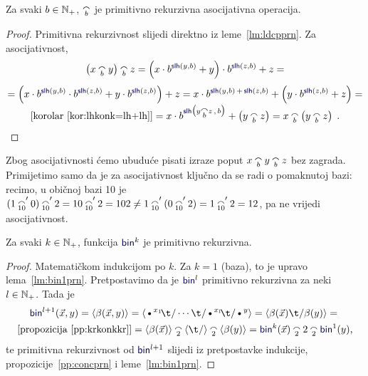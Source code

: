 \begin{propozicija}[{name=[primitivna rekurzivnost i asocijativnost konkatenacije]}]\label{pp:concprn}
Za svaki $b\in{\mathbb N}_+$, $\conc b$ je primitivno rekurzivna asocijativna operacija.
\end{propozicija}
\begin{proof}
Primitivna rekurzivnost slijedi direktno iz leme~\ref{lm:ldcpprn}. Za asocijativnost,
\begin{multline}
    \left(x\conc b y\right)\conc b z=\left(x\cdot b^{\f{slh}(y,b)}+y\right)\cdot b^{\f{slh}(z,b)}+z=\\[1mm]
    =\left(x\cdot b^{\f{slh}(y,b)}\cdot b^{\f{slh}(z,b)}+y\cdot b^{\f{slh}(z,b)}\right)+z=
    x\cdot b^{\f{slh}(y,b)\,+\,\f{slh}(z,b)}+\left(y\cdot b^{\f{slh}(z,b)}+z\right)=\\[-1mm]
    \text{[korolar~\ref{kor:lhkonk=lh+lh}]}{}=x\cdot b^{\f{slh}\bigl(y\conc b z\,,\,b\bigr)}+\left(y\conc b z\right)=x\conc b\left(y\conc b z\right)\text{\qedhere\;.}
\end{multline}
\end{proof}
Zbog asocijativnosti ćemo ubuduće pisati izraze poput $x\conc by\conc bz$ bez zagrada. Primijetimo samo da je za asocijativnost ključno da se radi o pomaknutoj bazi: recimo, u običnoj bazi 10 je $(1\conc{10}'0)\conc{10}'2=10\conc{10}'2=102\not=1\conc{10}'(0\conc{10}'2)=1\conc{10}'2=12$, pa ne vrijedi asocijativnost.

\begin{propozicija}[{name=[primitivna rekurzivnost višemjesnog binarnog kodiranja]}]\label{pp:binkprn}
Za svaki $k\in{\mathbb N}_+$, funkcija $\f{bin}^k$ je primitivno rekurzivna.
\end{propozicija}
\begin{proof}
Matematičkom indukcijom po $k$. Za $k=1$ (baza), to je upravo lema~\ref{lm:bin1prn}. Pretpostavimo da je $\f{bin}^l$ primitivno rekurzivna za neki $l\in{\mathbb N}_+$. Tada je
\begin{multline}
    \f{bin}^{l+1}(\vec x,y)=
    \kr{\beta(\vec x,y)}=
    \kr{\text\textbullet^{x_1}\!\t/\dotsm\t/\text\textbullet^{x_l}\!\t/\text\textbullet^y}=
    \kr{\beta(\vec x)\t/\beta(y)}={}\\
    \text{[propozicija~\ref{pp:krkonkkr}]}{}=\kr{\beta(\vec x)}\conc 2\kr{\t/}\conc 2\kr{\beta(y)}=
    \f{bin}^k(\vec x)\conc22\conc2\f{bin}^1(y)\text,
\end{multline}
te primitivna rekurzivnost od $\f{bin}^{l+1}$ slijedi iz pretpostavke indukcije, propozicije~\ref{pp:concprn} i leme~\ref{lm:bin1prn}.
\end{proof}

